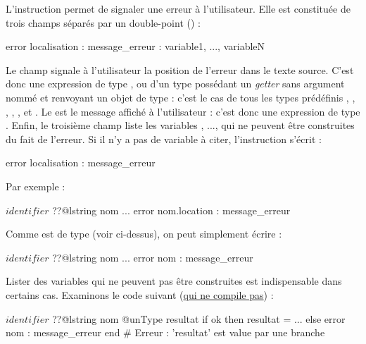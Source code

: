 L'instruction  permet de signaler une erreur à l'utilisateur. Elle est constituée de trois champs séparés par un double-point (\galgas{\:}) :

{
\begin{galgascode}
error localisation : message_erreur : variable1, ..., variableN
\end{galgascode}



Le champ  signale à l'utilisateur la position de l'erreur dans le texte source. C'est donc une expression de type , ou d'un type possédant un \emph{getter} sans argument nommé  et renvoyant un objet de type  : c'est le cas de tous les types prédéfinis , , , , ,  et . Le  est le message affiché à l'utilisateur : c'est donc une expression de type . Enfin, le troisième champ liste les variables , ...,  qui ne peuvent être construites du fait de l'erreur. Si il n'y a pas de variable à citer, l'instruction s'écrit :
\begin{galgascode}
error localisation : message_erreur
\end{galgascode}

Par exemple :

\begin{galgascode}
$identifier$ ??@lstring nom
...
error nom.location : message_erreur
\end{galgascode}

Comme  est de type  (voir ci-dessus), on peut simplement écrire :
\begin{galgascode}
$identifier$ ??@lstring nom
...
error nom : message_erreur
\end{galgascode}


Lister des variables qui ne peuvent pas être construites est indispensable dans certains cas. Examinons le code suivant (\underline{qui ne compile pas}) :
\begin{galgascode}
$identifier$ ??@lstring nom
@unType resultat
if ok then
  resultat = ...
else
  error nom : message_erreur
end # Erreur : 'resultat' est value par une branche
\end{galgascode}

}
